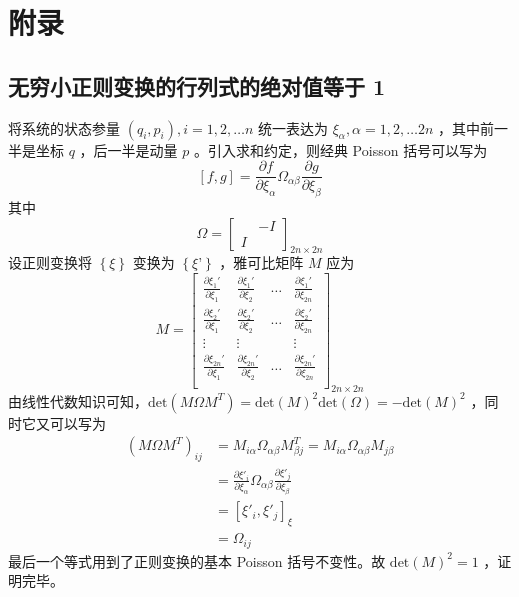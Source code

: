 \documentclass[hyperref,UTF-8]{ctexart}
\newcommand{\0}{\boldsymbol{0}}
\begin{document}
    
\section{附录}
\subsection{无穷小正则变换的行列式的绝对值等于 1}
将系统的状态参量 $(q_i,p_i), i = 1,2,\dots n$ 统一表达为 $\xi_\alpha, \alpha = 1,2,\dots 2n$ ，其中前一半是坐标 $q$ ，后一半是动量 $p$ 。引入求和约定，则经典 Poisson 括号可以写为
\[
    [f, g] = \frac{\partial f}{\partial \xi_\alpha}\Omega_{\alpha\beta}\frac{\partial g}{\partial \xi_\beta}
\]
其中
\[
    \Omega = \begin{bmatrix}
        & -I\\
        I&
    \end{bmatrix}_{2n\times 2n}
\]
设正则变换将 $\left \{ \xi \right \}$ 变换为 $\left \{ \xi’ \right \}$ ，雅可比矩阵 $M$ 应为
\[
    M = \begin{bmatrix}
        \frac{\partial \xi_1'}{\partial \xi_1} & \frac{\partial \xi_1'}{\partial \xi_2} & \dots  & \frac{\partial \xi_1'}{\partial \xi_{2n}} \\
        \frac{\partial \xi_2'}{\partial \xi_1} & \frac{\partial \xi_2'}{\partial \xi_2} & \dots  & \frac{\partial \xi_2'}{\partial \xi_{2n}} \\
        \vdots & \vdots &  & \vdots\\
        \frac{\partial \xi_{2n}'}{\partial \xi_1} & \frac{\partial \xi_{2n}'}{\partial \xi_2} & \dots  & \frac{\partial \xi_{2n}'}{\partial \xi_{2n}} \\
    \end{bmatrix}_{2n\times 2n}
\]
由线性代数知识可知，$\text{det}(M\Omega M^T) = \text{det}(M)^2 \text{det}(\Omega) = - \text{det}(M)^2$ ，同时它又可以写为
\begin{align*}
    (M\Omega M^T)_{ij} &= M_{i\alpha}\Omega_{\alpha\beta}M^T_{\beta j}
    = M_{i\alpha}\Omega_{\alpha\beta}M_{j\beta}\\
    &= \frac{\partial \xi'_i}{\partial \xi_\alpha}\Omega_{\alpha\beta}\frac{\partial \xi'_j}{\partial \xi_\beta}\\
    &= [\xi'_i, \xi'_j]_\xi\\
    &= \Omega_{ij}
\end{align*}
最后一个等式用到了正则变换的基本 Poisson 括号不变性。故 $\text{det}(M)^2 = 1$ ，证明完毕。
    
    


\end{document}
